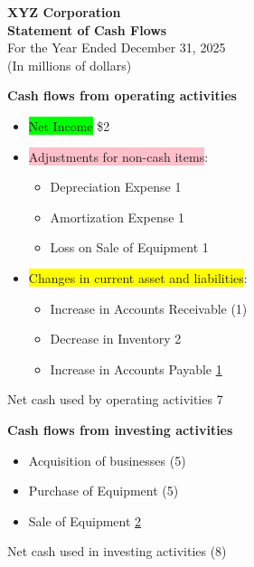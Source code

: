 \small

\begin{tcolorbox}[colframe=black,colback=white,title=Example Statement of Cash Flow]
    \begin{center}
        \textbf{XYZ Corporation}\\
        \textbf{Statement of Cash Flows}\\
        For the Year Ended December 31, 2025\\
        (In millions of dollars)
    \end{center}

    \textbf{Cash flows from operating activities}
    \begin{itemize}[label={}, leftmargin=*]
        \item \colorbox{lime}{Net Income} \hfill \$2
        \item \colorbox{pink}{Adjustments for non-cash items}:
              \begin{itemize}[label={}, leftmargin=*]
                  \item Depreciation Expense \hfill 1
                  \item Amortization Expense \hfill 1
                  \item Loss on Sale of Equipment \hfill 1
              \end{itemize}
        \item \colorbox{yellow}{Changes in current asset and liabilities}:
              \begin{itemize}[label={}, leftmargin=*]
                  \item Increase in Accounts Receivable \hfill (1)
                  \item Decrease in Inventory \hfill 2
                  \item Increase in Accounts Payable \hfill \underline{1}
              \end{itemize}
    \end{itemize}
    Net cash used by operating activities \hfill 7

    \textbf{Cash flows from investing activities}
    \begin{itemize}[label={}, leftmargin=*]
        \item Acquisition of businesses \hfill (5)
        \item Purchase of Equipment \hfill (5)
        \item Sale of Equipment \hfill \underline{2}
    \end{itemize}
    Net cash used in investing activities \hfill (8)


\end{tcolorbox}
